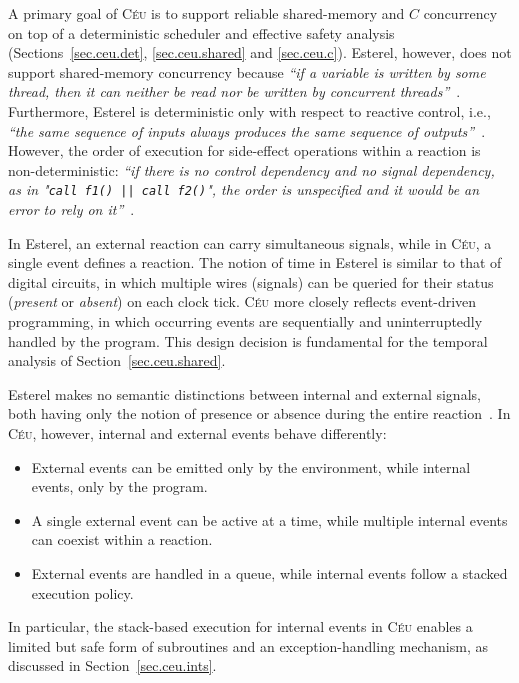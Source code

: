 \documentclass[letterpaper]{sig-alternate}
\newcommand{\code}[1] {{\small{\texttt{#1}}}}
\newcommand{\CEU}{\textsc{C\'{e}u}\xspace}
\begin{document}
A primary goal of \CEU is to support reliable shared-memory and $C$ concurrency 
on top of a deterministic scheduler and effective safety analysis
(Sections~\ref{sec.ceu.det}, \ref{sec.ceu.shared} and \ref{sec.ceu.c}).
%
Esterel, however, does not support shared-memory concurrency because \emph{``if 
a variable is written by some thread, then it can neither be read nor be 
written by concurrent threads''}~\cite{esterel.primer}.
%
Furthermore, Esterel is deterministic only with respect to reactive control, 
i.e., \emph{``the same sequence of inputs always produces the same sequence of 
outputs''}~\cite{esterel.primer}.
However, the order of execution for side-effect operations within a reaction is 
non-deterministic: \emph{``if there is no control dependency and no signal 
dependency, as in "\code{call f1() || call f2()}", the order is unspecified and 
it would be an error to rely on it''}~\cite{esterel.primer}.
%

In Esterel, an external reaction can carry simultaneous signals, while in \CEU, 
a single event defines a reaction.
%
The notion of time in Esterel is similar to that of digital circuits, in which 
multiple wires (signals) can be queried for their status (\emph{present} or 
\emph{absent}) on each clock tick.
%
\CEU more closely reflects event-driven programming, in which occurring events 
are sequentially and uninterruptedly handled by the program.
%
This design decision is fundamental for the temporal analysis of 
Section~\ref{sec.ceu.shared}.%

Esterel makes no semantic distinctions between internal and external signals, 
both having only the notion of presence or absence during the entire 
reaction~\cite{esterel.preemption}.
%
In \CEU, however, internal and external events behave differently:
%
\begin{itemize}
\item External events can be emitted only by the environment, while internal 
events, only by the program.
\item A single external event can be active at a time, while multiple internal 
events can coexist within a reaction.
\item External events are handled in a queue, while internal events follow a 
stacked execution policy.
\end{itemize}
%
In particular, the stack-based execution for internal events in \CEU enables a 
limited but safe form of subroutines and an exception-handling mechanism, as 
discussed in Section~\ref{sec.ceu.ints}.
\end{document}

